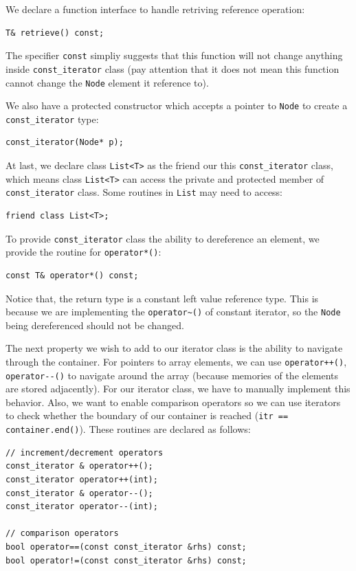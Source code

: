 \documentclass[11pt]{book}
\begin{document}
We declare a function interface to handle retriving reference operation:
\begin{verbatim}
T& retrieve() const;
\end{verbatim}

The specifier \texttt{const} simpliy suggests that this function will not change anything inside \texttt{const\_iterator} class (pay attention that it does not mean this function cannot change the \texttt{Node} element it reference to).

We also have a protected constructor which accepts a pointer to \texttt{Node} to create a \texttt{const\_iterator} type:
\begin{verbatim}
const_iterator(Node* p);
\end{verbatim}

At last, we declare class \texttt{List<T>} as the friend our this \texttt{const\_iterator} class, which means class \texttt{List<T>} can access the private and protected member of \texttt{const\_iterator} class. Some routines in \texttt{List} may need to access:
\begin{verbatim}
friend class List<T>;
\end{verbatim}

To provide \texttt{const\_iterator} class the ability to dereference an element, we provide the routine for \texttt{operator*()}:
\begin{verbatim}
const T& operator*() const;
\end{verbatim}
Notice that, the return type is a constant left value reference type. This is because we are implementing the \texttt{operator\textasciitilde{}()} of constant iterator, so the \texttt{Node} being dereferenced should not be changed.

The next property we wish to add to our iterator class is the ability to navigate through the container. For pointers to array elements, we can use \texttt{operator++()}, \texttt{operator-{}-()} to navigate around the array (because memories of the elements are stored adjacently). For our iterator class, we have to manually implement this behavior. Also, we want to enable comparison operators so we can use iterators to check whether the boundary of our container is reached (\texttt{itr == container.end()}). These routines are declared as follows:
\begin{verbatim}
// increment/decrement operators
const_iterator & operator++();
const_iterator operator++(int);
const_iterator & operator--();
const_iterator operator--(int);

// comparison operators
bool operator==(const const_iterator &rhs) const;
bool operator!=(const const_iterator &rhs) const;
\end{verbatim}
\end{document}
